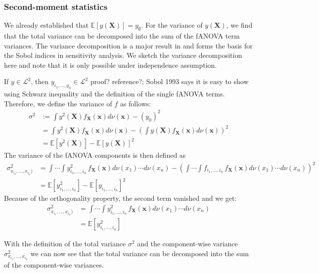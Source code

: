 \subsubsection*{Second-moment statistics}
We already established that $\mathbb{E}[y(\boldsymbol{X})] = y_{\emptyset}$.
For the variance of $y(\boldsymbol{X})$, we find that the total variance can be decomposed into the sum of the fANOVA term variances. The variance decomposition is a major result in \cite{sobol1993sensitivity} and forms the basis for the Sobol indices in sensitivity analysis. We sketch the variance decomposition here and note that it is only possible under independence assumption.\par
If $y \in \mathcal{L}^2$, then $y_{i_{1}, \dots, y_{n}} \in \mathcal{L}^2$ {\color{blue}proof? reference?; Sobol 1993 says it is easy to show using Schwarz inequality and the definition of the single fANOVA terms.}
Therefore, we define the variance of $f$ as follows:
\begin{align*}
    \sigma^2 &:= \int y^2(\boldsymbol{X}) f_{\boldsymbol{X}}(\boldsymbol{x}) d\nu (\boldsymbol{x}) - (y_0)^2 \\
    &= \int y^2(\boldsymbol{X}) f_{\boldsymbol{X}}(\boldsymbol{x}) d\nu (\boldsymbol{x}) - (\int y(\boldsymbol{X}) f_{\boldsymbol{X}}(\boldsymbol{x}) d\nu (\boldsymbol{x}))^2 \\
    &= \mathbb{E}[y^2(\boldsymbol{X})] - \mathbb{E}[y(\boldsymbol{X})]^2
    \label{variance_whole}
\end{align*}
The variance of the fANOVA components is then defined as
\begin{align*}
    \sigma^2_{x_{i_1}, \dots, x_{i_n})}
    &= \int \cdots \int y^2_{i_{1}, \dots, i_{n}} \, f_{\boldsymbol{X}}(\boldsymbol{x}) d\nu(x_1) \cdots d\nu(x_n) - \left( \int \cdots \int f_{i_{1}, \dots, i_{n}} \, f_{\boldsymbol{X}}(\boldsymbol{x}) d\nu(x_1) \cdots d\nu(x_n) \right)^2\\
    &= \mathbb{E}[y^2_{i_{1}, \dots, i_{n}}] - \mathbb{E}[y_{i_{1}, \dots, i_{n}}]^2
\end{align*}
Because of the orthogonality property, the second term vanished and we get:
\begin{align*}
    \sigma^2_{x_{i_1}, \dots, x_{i_n})}
    &= \int \cdots \int y^2_{i_{1}, \dots, i_{n}} \, f_{\boldsymbol{X}}(\boldsymbol{x}) d\nu(x_1) \cdots d\nu(x_n)\\
    &= \mathbb{E}[y^2_{i_{1}, \dots, i_{n}}]
\end{align*}

With the definition of the total variance $\sigma^2$ and the component-wise variance $\sigma^2_{x_{i_1}, \dots, x_{i_n}}$ we can now see that the total variance can be decomposed into the sum of the component-wise variances.

